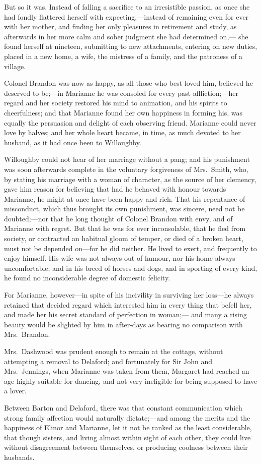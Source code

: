\documentclass{article}
\begin{document}
But so it was.  Instead of falling a sacrifice
to an irresistible passion, as once she had fondly
flattered herself with expecting,---instead of remaining
even for ever with her mother, and finding her only
pleasures in retirement and study, as afterwards in her
more calm and sober judgment she had determined on,---%
she found herself at nineteen, submitting to new attachments,
entering on new duties, placed in a new home, a wife,
the mistress of a family, and the patroness of a village.

Colonel Brandon was now as happy, as all those who best
loved him, believed he deserved to be;---in Marianne he
was consoled for every past affliction;---her regard and her
society restored his mind to animation, and his spirits
to cheerfulness; and that Marianne found her own happiness
in forming his, was equally the persuasion and delight
of each observing friend.  Marianne could never love
by halves; and her whole heart became, in time, as much
devoted to her husband, as it had once been to Willoughby.

Willoughby could not hear of her marriage without
a pang; and his punishment was soon afterwards complete
in the voluntary forgiveness of Mrs.\ Smith, who, by stating
his marriage with a woman of character, as the source
of her clemency, gave him reason for believing that had he
behaved with honour towards Marianne, he might at once have
been happy and rich.  That his repentance of misconduct,
which thus brought its own punishment, was sincere,
need not be doubted;---nor that he long thought of Colonel
Brandon with envy, and of Marianne with regret.  But that
he was for ever inconsolable, that he fled from society,
or contracted an habitual gloom of temper, or died of a
broken heart, must not be depended on---for he did neither.
He lived to exert, and frequently to enjoy himself.
His wife was not always out of humour, nor his home
always uncomfortable; and in his breed of horses and dogs,
and in sporting of every kind, he found no inconsiderable
degree of domestic felicity.

For Marianne, however---in spite of his incivility
in surviving her loss---he always retained that decided
regard which interested him in every thing that befell her,
and made her his secret standard of perfection in woman;---%
and many a rising beauty would be slighted by him in
after-days as bearing no comparison with Mrs.\ Brandon.

Mrs.\ Dashwood was prudent enough to remain at the cottage,
without attempting a removal to Delaford; and fortunately for
Sir John and Mrs.\ Jennings, when Marianne was taken from them,
Margaret had reached an age highly suitable for dancing,
and not very ineligible for being supposed to have a lover.

Between Barton and Delaford, there was that constant
communication which strong family affection would
naturally dictate;---and among the merits and the happiness
of Elinor and Marianne, let it not be ranked as the least
considerable, that though sisters, and living almost within
sight of each other, they could live without disagreement
between themselves, or producing coolness between their husbands.
\end{document}
